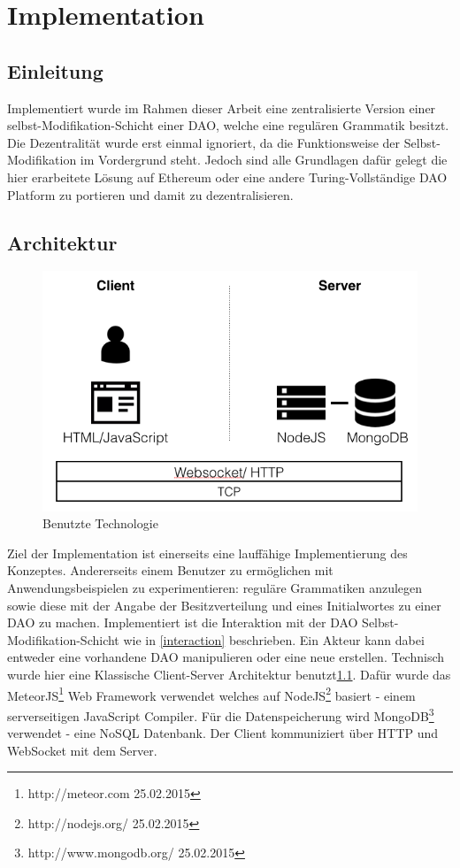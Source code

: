 \documentclass[a4paper,12pt]{report}
\begin{document}
\chapter{Implementation}
\label{implementation}

\section*{Einleitung}
Implementiert wurde im Rahmen dieser Arbeit eine zentralisierte Version einer selbst-Modifikation-Schicht einer DAO, welche eine regulären Grammatik besitzt. Die Dezentralität wurde erst einmal ignoriert, da die Funktionsweise der Selbst-Modifikation im Vordergrund steht. Jedoch sind alle Grundlagen dafür gelegt die hier erarbeitete Lösung auf Ethereum oder eine andere Turing-Vollständige DAO Platform zu portieren und damit zu dezentralisieren.
\section*{Architektur}

\begin{figure}[ht]
    \centering
    \includegraphics[width=1\textwidth]{bilder/client-server.png}
    \caption{Benutzte Technologie}
    \label{client-server}
\end{figure}

Ziel der Implementation ist einerseits eine lauffähige Implementierung des Konzeptes. Andererseits einem Benutzer zu ermöglichen mit Anwendungsbeispielen zu experimentieren: reguläre Grammatiken anzulegen sowie diese mit der Angabe der Besitzverteilung und eines Initialwortes zu einer DAO zu machen.
Implementiert ist die Interaktion mit der DAO Selbst-Modifikation-Schicht wie in \ref{interaction} beschrieben. Ein Akteur kann dabei entweder eine vorhandene DAO manipulieren oder eine neue erstellen. Technisch wurde hier eine Klassische Client-Server Architektur benutzt\ref{client-server}. Dafür wurde das MeteorJS\footnote{http://meteor.com 25.02.2015} Web Framework verwendet
welches auf NodeJS\footnote{http://nodejs.org/ 25.02.2015} basiert - einem serverseitigen JavaScript Compiler. Für die Datenspeicherung wird MongoDB\footnote{http://www.mongodb.org/ 25.02.2015} verwendet - eine NoSQL Datenbank. Der Client kommuniziert über HTTP und WebSocket mit dem Server.
\end{document}
